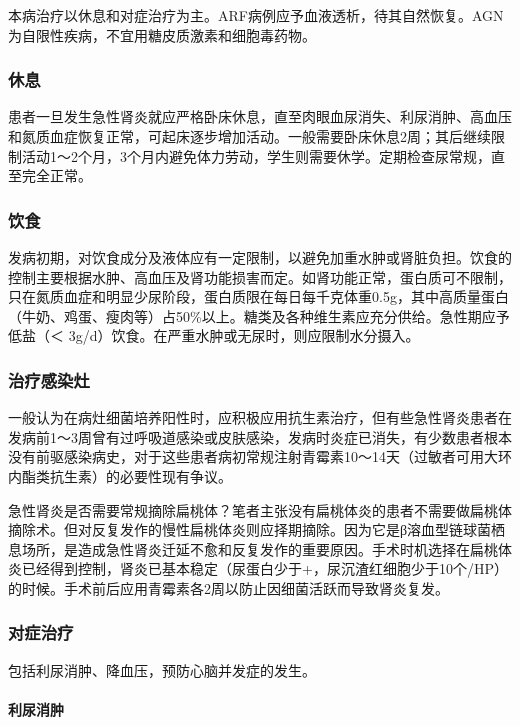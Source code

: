 本病治疗以休息和对症治疗为主。ARF病例应予血液透析，待其自然恢复。AGN为自限性疾病，不宜用糖皮质激素和细胞毒药物。

\subsubsection{休息}

患者一旦发生急性肾炎就应严格卧床休息，直至肉眼血尿消失、利尿消肿、高血压和氮质血症恢复正常，可起床逐步增加活动。一般需要卧床休息2周；其后继续限制活动1～2个月，3个月内避免体力劳动，学生则需要休学。定期检查尿常规，直至完全正常。

\subsubsection{饮食}

发病初期，对饮食成分及液体应有一定限制，以避免加重水肿或肾脏负担。饮食的控制主要根据水肿、高血压及肾功能损害而定。如肾功能正常，蛋白质可不限制，只在氮质血症和明显少尿阶段，蛋白质限在每日每千克体重0.5g，其中高质量蛋白（牛奶、鸡蛋、瘦肉等）占50\%以上。糖类及各种维生素应充分供给。急性期应予低盐（＜
3g/d）饮食。在严重水肿或无尿时，则应限制水分摄入。

\subsubsection{治疗感染灶}

一般认为在病灶细菌培养阳性时，应积极应用抗生素治疗，但有些急性肾炎患者在发病前1～3周曾有过呼吸道感染或皮肤感染，发病时炎症已消失，有少数患者根本没有前驱感染病史，对于这些患者病初常规注射青霉素10～14天（过敏者可用大环内酯类抗生素）的必要性现有争议。

急性肾炎是否需要常规摘除扁桃体？笔者主张没有扁桃体炎的患者不需要做扁桃体摘除术。但对反复发作的慢性扁桃体炎则应择期摘除。因为它是β溶血型链球菌栖息场所，是造成急性肾炎迁延不愈和反复发作的重要原因。手术时机选择在扁桃体炎已经得到控制，肾炎已基本稳定（尿蛋白少于+，尿沉渣红细胞少于10个/HP）的时候。手术前后应用青霉素各2周以防止因细菌活跃而导致肾炎复发。

\subsubsection{对症治疗}

包括利尿消肿、降血压，预防心脑并发症的发生。

\paragraph{利尿消肿}

